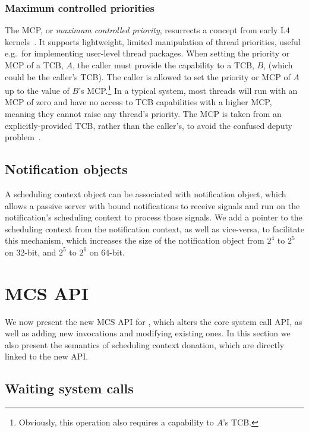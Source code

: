 \subsubsection{Maximum controlled priorities}

The MCP, or \emph{maximum controlled priority}, resurrects a concept from early L4
kernels~\citep{Liedtke_96:rm}. It supports lightweight, limited manipulation of thread priorities,
useful e.g.\ for implementing user-level thread packages. When setting
the priority or MCP of a TCB, \(A\),
the caller must provide the capability to a TCB, \(B\), (which could be the caller's
TCB). The caller is allowed to set the priority or MCP of \(A\) up to the value
of \(B\)'s MCP.\footnote{Obviously, this operation also requires a capability to \(A\)'s TCB.}
In a typical system, most threads
will run with an MCP of zero and have no access to TCB capabilities with a higher MCP, meaning they
cannot raise any thread's priority.
The MCP is taken from an explicitly-provided TCB, rather than the caller's, to avoid the
confused deputy problem~\citep{Hardy_88}.

\subsection{Notification objects}

A scheduling context object can be associated with notification object, which allows a passive
server with bound notifications to receive signals and run on the notification's
scheduling context to process those signals.
We add a pointer to the scheduling context from the notification context, as well as vice-versa, to 
facilitate this mechanism, which increases the size of the notification object from $2^{4}$ to
$2^{5}$ on 32-bit, and $2^{5}$ to $2^{6}$ on 64-bit. 

\section{MCS API}
\label{s:new-api}

We now present the new \gls{MCS} API for \selfour, which alters the core system call API, 
as well as adding new invocations and modifying existing ones. In this section we also
present the semantics of scheduling context donation, which are directly linked to the new API.

\subsection{Waiting system calls}

